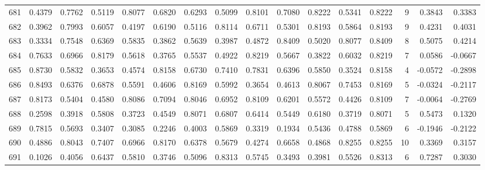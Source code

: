 \begin{tabular}{lrrrrrrrrrrrrrrr}
681 &      0.4379 &  0.7762 &  0.5119 &  0.8077 &  0.6820 &  0.6293 &  0.5099 &  0.8101 &  0.7080 &  0.8222 &   0.5341 &     0.8222 &      9 &                    0.3843 &                     0.3383 \\
682 &      0.3962 &  0.7993 &  0.6057 &  0.4197 &  0.6190 &  0.5116 &  0.8114 &  0.6711 &  0.5301 &  0.8193 &   0.5864 &     0.8193 &      9 &                    0.4231 &                     0.4031 \\
683 &      0.3334 &  0.7548 &  0.6369 &  0.5835 &  0.3862 &  0.5639 &  0.3987 &  0.4872 &  0.8409 &  0.5020 &   0.8077 &     0.8409 &      8 &                    0.5075 &                     0.4214 \\
684 &      0.7633 &  0.6966 &  0.8179 &  0.5618 &  0.3765 &  0.5537 &  0.4922 &  0.8219 &  0.5667 &  0.3822 &   0.6032 &     0.8219 &      7 &                    0.0586 &                    -0.0667 \\
685 &      0.8730 &  0.5832 &  0.3653 &  0.4574 &  0.8158 &  0.6730 &  0.7410 &  0.7831 &  0.6396 &  0.5850 &   0.3524 &     0.8158 &      4 &                   -0.0572 &                    -0.2898 \\
686 &      0.8493 &  0.6376 &  0.6878 &  0.5591 &  0.4606 &  0.8169 &  0.5992 &  0.3654 &  0.4613 &  0.8067 &   0.7453 &     0.8169 &      5 &                   -0.0324 &                    -0.2117 \\
687 &      0.8173 &  0.5404 &  0.4580 &  0.8086 &  0.7094 &  0.8046 &  0.6952 &  0.8109 &  0.6201 &  0.5572 &   0.4426 &     0.8109 &      7 &                   -0.0064 &                    -0.2769 \\
688 &      0.2598 &  0.3918 &  0.5808 &  0.3723 &  0.4549 &  0.8071 &  0.6807 &  0.6414 &  0.5449 &  0.6180 &   0.3719 &     0.8071 &      5 &                    0.5473 &                     0.1320 \\
689 &      0.7815 &  0.5693 &  0.3407 &  0.3085 &  0.2246 &  0.4003 &  0.5869 &  0.3319 &  0.1934 &  0.5436 &   0.4788 &     0.5869 &      6 &                   -0.1946 &                    -0.2122 \\
690 &      0.4886 &  0.8043 &  0.7407 &  0.6966 &  0.8170 &  0.6378 &  0.5679 &  0.4274 &  0.6658 &  0.4868 &   0.8255 &     0.8255 &     10 &                    0.3369 &                     0.3157 \\
691 &      0.1026 &  0.4056 &  0.6437 &  0.5810 &  0.3746 &  0.5096 &  0.8313 &  0.5745 &  0.3493 &  0.3981 &   0.5526 &     0.8313 &      6 &                    0.7287 &                     0.3030 \\

\end{tabular}
